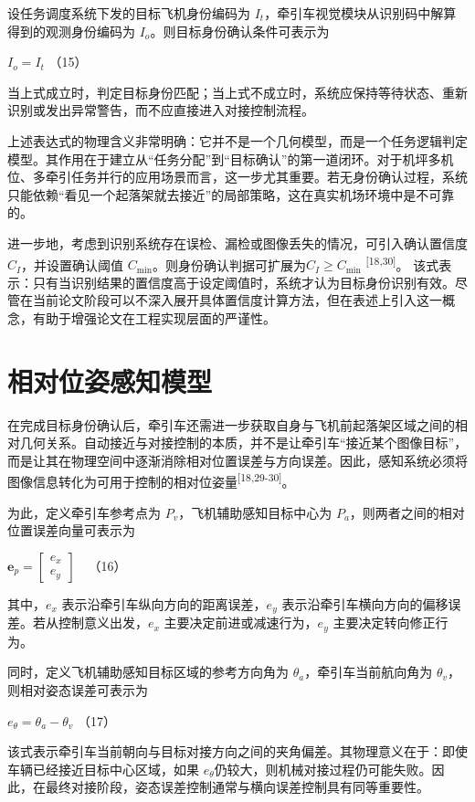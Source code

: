 设任务调度系统下发的目标飞机身份编码为
\(I_{t}\)，牵引车视觉模块从识别码中解算得到的观测身份编码为
\(I_{o}\)。则目标身份确认条件可表示为

\(I_{o} = I_{t}\) （15）

当上式成立时，判定目标身份匹配；当上式不成立时，系统应保持等待状态、重新识别或发出异常警告，而不应直接进入对接控制流程。

上述表达式的物理含义非常明确：它并不是一个几何模型，而是一个任务逻辑判定模型。其作用在于建立从“任务分配”到“目标确认”的第一道闭环。对于机坪多机位、多牵引任务并行的应用场景而言，这一步尤其重要。若无身份确认过程，系统只能依赖“看见一个起落架就去接近”的局部策略，这在真实机场环境中是不可靠的。

进一步地，考虑到识别系统存在误检、漏检或图像丢失的情况，可引入确认置信度
\(C_{I}\)，并设置确认阈值
\(C_{\min}\)。则身份确认判据可扩展为\(C_{I} \geq C_{\min}\)
\textsuperscript{[18,30]}。\(
\)
该式表示：只有当识别结果的置信度高于设定阈值时，系统才认为目标身份识别有效。尽管在当前论文阶段可以不深入展开具体置信度计算方法，但在表述上引入这一概念，有助于增强论文在工程实现层面的严谨性。

\section{相对位姿感知模型}

在完成目标身份确认后，牵引车还需进一步获取自身与飞机前起落架区域之间的相对几何关系。自动接近与对接控制的本质，并不是让牵引车“接近某个图像目标”，而是让其在物理空间中逐渐消除相对位置误差与方向误差。因此，感知系统必须将图像信息转化为可用于控制的相对位姿量\textsuperscript{[18,29-30]}。

为此，定义牵引车参考点为 \(P_{v}\)，飞机辅助感知目标中心为
\(P_{a}\)，则两者之间的相对位置误差向量可表示为

\(\mathbf{e}_{p} = \left\lbrack \begin{array}{r}
e_{x} \\
e_{y}
\end{array} \right\rbrack\ \ \ \) （16）

其中，\(e_{x}\) 表示沿牵引车纵向方向的距离误差，\(e_{y}\)
表示沿牵引车横向方向的偏移误差。若从控制意义出发，\(e_{x}\)
主要决定前进或减速行为，\(e_{y}\) 主要决定转向修正行为。

同时，定义飞机辅助感知目标区域的参考方向角为
\(\theta_{a}\)，牵引车当前航向角为
\(\theta_{v}\)，则相对姿态误差可表示为

\(e_{\theta} = \theta_{a} - \theta_{v}\) （17）

该式表示牵引车当前朝向与目标对接方向之间的夹角偏差。其物理意义在于：即使车辆已经接近目标中心区域，如果
\(e_{\theta}\)仍较大，则机械对接过程仍可能失败。因此，在最终对接阶段，姿态误差控制通常与横向误差控制具有同等重要性。

